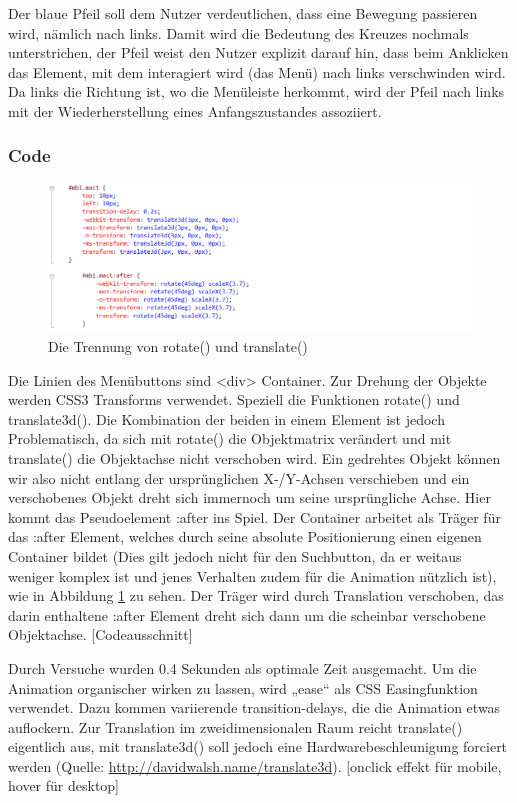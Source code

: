Der blaue Pfeil soll dem Nutzer verdeutlichen, dass eine Bewegung passieren wird, nämlich nach links. Damit wird die Bedeutung des Kreuzes nochmals unterstrichen, der Pfeil weist den Nutzer explizit darauf hin, dass beim Anklicken das Element, mit dem interagiert wird (das Menü) nach links verschwinden wird. Da links die Richtung ist, wo die Menüleiste herkommt, wird der Pfeil nach links mit der Wiederherstellung eines Anfangszustandes assoziiert.


\subsubsection{Code}

\begin{figure} [h]
\includegraphics[width=\textwidth]{./img/css_after.png}
\caption{Die Trennung von rotate() und translate()}
\label{css_after}
\end{figure}
Die Linien des Menübuttons sind <div> Container. Zur Drehung der Objekte werden CSS3 Transforms verwendet. Speziell die Funktionen rotate() und translate3d(). Die Kombination der beiden in einem Element ist jedoch Problematisch, da sich mit rotate() die Objektmatrix verändert und mit translate() die Objektachse nicht verschoben wird. Ein gedrehtes Objekt können wir also nicht entlang der ursprünglichen X-/Y-Achsen verschieben und ein verschobenes Objekt dreht sich immernoch um seine ursprüngliche Achse. Hier kommt das Pseudoelement :after ins Spiel. Der Container arbeitet als Träger für das :after Element, welches durch seine absolute Positionierung einen eigenen Container bildet (Dies gilt jedoch nicht für den Suchbutton, da er weitaus weniger komplex ist und jenes Verhalten zudem für die Animation nützlich ist), wie in Abbildung \ref{css_after} zu sehen. Der Träger wird durch Translation verschoben, das darin enthaltene :after Element dreht sich dann um die scheinbar verschobene Objektachse. [Codeausschnitt]


Durch Versuche wurden 0.4 Sekunden als optimale Zeit ausgemacht. Um die Animation organischer wirken zu lassen, wird „ease“ als CSS Easingfunktion verwendet. Dazu kommen variierende transition-delays, die die Animation etwas auflockern.
Zur Translation im zweidimensionalen Raum reicht translate() eigentlich aus, mit translate3d() soll jedoch eine Hardwarebeschleunigung forciert werden (Quelle: \url{http://davidwalsh.name/translate3d}).
[onclick effekt für mobile, hover für desktop]

